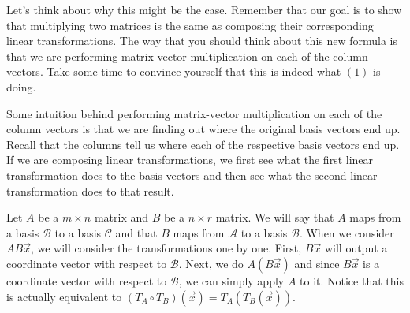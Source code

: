 Let's think about why this might be the case. Remember that our goal is to show that multiplying two matrices is the same as composing their corresponding linear transformations. The way that you should think about this new formula is that we are performing matrix-vector multiplication on each of the column vectors. Take some time to convince yourself that this is indeed what $(1)$ is doing.
\begin{remark}
    Some intuition behind performing matrix-vector multiplication on each of the column vectors is that we are finding out where the original basis vectors end up. Recall that the columns tell us where each of the respective basis vectors end up. If we are composing linear transformations, we first see what the first linear transformation does to the basis vectors and then see what the second linear transformation does to that result.
\end{remark}
Let $A$ be a $m\times n$ matrix and $B$ be a $n\times r$ matrix. We will say that $A$ maps from a basis $\mathcal{B}$ to a basis $\mathcal{C}$ and that $B$ maps from $\mathcal{A}$ to a basis $\mathcal{B}$. When we consider $AB\vec{x}$, we will consider the transformations one by one. First, $B\vec{x}$ will output a coordinate vector with respect to $\mathcal{B}$. Next, we do $A(B\vec{x})$ and since $B\vec{x}$ is a coordinate vector with respect to $\mathcal{B}$, we can simply apply $A$ to it. Notice that this is actually equivalent to $(T_A\circ T_B)(\vec{x})=T_A(T_B(\vec{x}))$.


